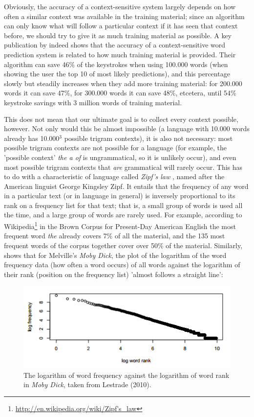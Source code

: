 \documentclass[11pt]{article}
\begin{document}
Obviously, the accuracy of a context-sensitive system largely depends on how often a similar context was available in the training material; since an algorithm can only know what will follow a particular context if it has seen that context before, we should try to give it as much training material as possible. A key publication by  indeed shows that the accuracy of a context-sensitive word prediction system is related to how much training material is provided. Their algorithm can save 46\% of the keystrokes when using 100.000 words (when showing the user the top 10 of most likely predictions), and this percentage slowly but steadily increases when they add more training material: for 200.000 words it can save 47\%, for 300.000 words it can save 48\%, etcetera, until 54\% keystroke savings with 3 million words of training material.

This does not mean that our ultimate goal is to collect every context possible, however. Not only would this be almost impossible (a language with 10.000 words already has 10.000$^3$ possible trigram contexts), it is also not necessary: most possible trigram contexts are not possible for a language (for example, the 'possible context' \emph{the a of} is ungrammatical, so it is unlikely occur), and even most possible trigram contexts that \emph{are} grammatical will rarely occur. This has to do with a characteristic of language called \emph{Zipf's law} \cite{zipf65}, named after the American linguist George Kingsley Zipf. It entails that the frequency of any word in a particular text (or in language in general) is inversely proportional to its rank on a frequency list for that text; that is, a small group of words is used all the time, and a large group of words are rarely used. For example, according to Wikipedia\footnote{\url{http://en.wikipedia.org/wiki/Zipf's\_law}} in the Brown Corpus for Present-Day American English the most frequent word \emph{the} already covers 7\% of all the material, and the 135 most frequent words of the corpus together cover over 50\% of the material. Similarly,  shows that for Melville's \emph{Moby Dick}, the plot of the logarithm of the word frequency data (how often a word occurs) of all words against the logarithm of their rank (position on the frequency list) 'almost follows a straight line': 

\begin{figure}[H]
\includegraphics[scale=1]{lestrade} \centering
\caption{The logarithm of word frequency against the logarithm of word rank in \emph{Moby Dick}, taken from Lestrade (2010).}
\end{figure}
\end{document}
